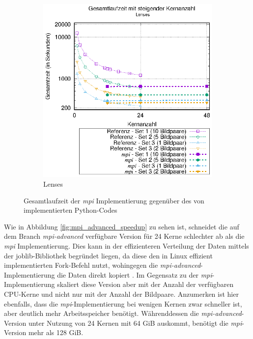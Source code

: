 \begin{center}
\begin{figure}[h]
\begin{subfigure}[b]{0.45\textwidth}
			\includegraphics[width=\textwidth]{pdf/mpi_times_lenses}
			\caption{Lenses}
			\label{fig:mpi_times_lenses}
		\end{subfigure}
		\caption{Gesamtlaufzeit der \textit{mpi} Implementierung gegenüber des von \citeauthor{Coj17} implementierten Python-Codes}
		\label{fig:mpi_times}
	\end{figure}
\end{center}

Wie in Abbildung \ref{fig:mpi_advanced_speedup} zu sehen ist, schneidet die auf dem Branch \textit{mpi-advanced} verfügbare Version \cite{CBS18} für 24 Kerne schlechter ab als die \textit{mpi} Implementierung. Dies kann in der effizienteren Verteilung der Daten mittels der joblib-Bibliothek begründet liegen, da diese den in Linux effizient implementierten Fork-Befehl nutzt, wohingegen die \textit{mpi-advanced}-Implementierung die Daten direkt kopiert \cite{GVB+18}. Im Gegensatz zu der \textit{mpi}-Implementierung skaliert diese Version aber mit der Anzahl der verfügbaren \gls{CPU}-Kerne und nicht nur mit der Anzahl der Bildpaare. Anzumerken ist hier ebenfalls, dass die \textit{mpi}-Implementierung bei wenigen Kernen zwar schneller ist, aber deutlich mehr Arbeitsspeicher benötigt. Währenddessen die \textit{mpi-advanced}-Version unter Nutzung von 24 Kernen mit 64 \gls{GiB} auskommt, benötigt die \textit{mpi}-Version mehr als 128 \gls{GiB}.

